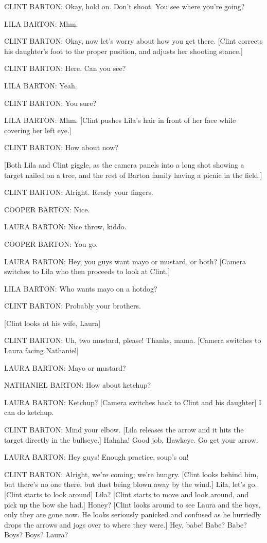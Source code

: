 CLINT BARTON: Okay, hold on. Don't shoot. You see where you're going?

LILA BARTON: Mhm.

CLINT BARTON: Okay, now let's worry about how you get there. [Clint corrects his daughter's foot to the proper position, and adjusts her shooting stance.]

CLINT BARTON: Here. Can you see?

LILA BARTON: Yeah.

CLINT BARTON: You sure?

LILA BARTON: Mhm. [Clint pushes Lila's hair in front of her face while covering her left eye.]

CLINT BARTON: How about now?

[Both Lila and Clint giggle, as the camera panels into a long shot showing a target nailed on a tree, and the rest of Barton family having a picnic in the field.]

CLINT BARTON: Alright. Ready your fingers.

COOPER BARTON: Nice.

LAURA BARTON: Nice throw, kiddo.

COOPER BARTON: You go.

LAURA BARTON: Hey, you guys want mayo or mustard, or both? [Camera switches to Lila who then proceeds to look at Clint.]

LILA BARTON: Who wants mayo on a hotdog?

CLINT BARTON: Probably your brothers.

[Clint looks at his wife, Laura]

CLINT BARTON: Uh, two mustard, please! Thanks, mama. [Camera switches to Laura facing Nathaniel]

LAURA BARTON: Mayo or mustard?

NATHANIEL BARTON: How about ketchup?

LAURA BARTON: Ketchup? [Camera switches back to Clint and his daughter] I can do ketchup.

CLINT BARTON: Mind your elbow. [Lila releases the arrow and it hits the target directly in the bullseye.] Hahaha! Good job, Hawkeye. Go get your arrow.

LAURA BARTON: Hey guys! Enough practice, soup's on!

CLINT BARTON: Alright, we're coming; we're hungry. [Clint looks behind him, but there's no one there, but dust being blown away by the wind.] Lila, let's go. [Clint starts to look around] Lila? [Clint starts to move and look around, and pick up the bow she had.] Honey? [Clint looks around to see Laura and the boys, only they are gone now. He looks seriously panicked and confused as he hurriedly drops the arrows and jogs over to where they were.] Hey, babe! Babe? Babe? Boys? Boys? Laura?

